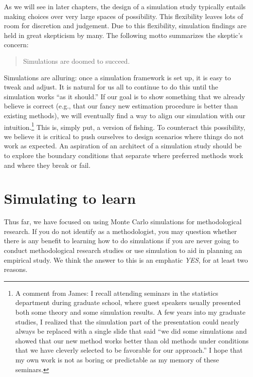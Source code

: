 \documentclass[
]{book}
\begin{document}
As we will see in later chapters, the design of a simulation study typically entails making choices over very large spaces of possibility.
This flexibility leaves lots of room for discretion and judgement.
Due to this flexibility, simulation findings are held in great skepticism by many.
The following motto summarizes the skeptic's concern:

\begin{quote}
Simulations are doomed to succeed.
\end{quote}

Simulations are alluring: once a simulation framework is set up, it is easy to tweak and adjust.
It is natural for us all to continue to do this until the simulation works ``as it should.''
If our goal is to show something that we already believe is correct (e.g., that our fancy new estimation procedure is better than existing methods), we will eventually find a way to align our simulation with our intuition.\footnote{A comment from James: I recall attending seminars in the statistics department during graduate school, where guest speakers usually presented both some theory and some simulation results. A few years into my graduate studies, I realized that the simulation part of the presentation could nearly always be replaced with a single slide that said ``we did some simulations and showed that our new method works better than old methods under conditions that we have cleverly selected to be favorable for our approach.'' I hope that my own work is not as boring or predictable as my memory of these seminars.}
This is, simply put, a version of fishing.
To counteract this possibility, we believe it is critical to push ourselves to design scenarios where things do not work as expected.
An aspiration of an architect of a simulation study should be to explore the boundary conditions that separate where preferred methods work and where they break or fail.

\section{Simulating to learn}\label{simulating-to-learn}

Thus far, we have focused on using Monte Carlo simulations for methodological research.
If you do not identify as a methodologist, you may question whether there is any benefit to learning how to do simulations if you are never going to conduct methodological research studies or use simulation to aid in planning an empirical study.
We think the answer to this is an emphatic \emph{YES}, for at least two reasons.
\end{document}
